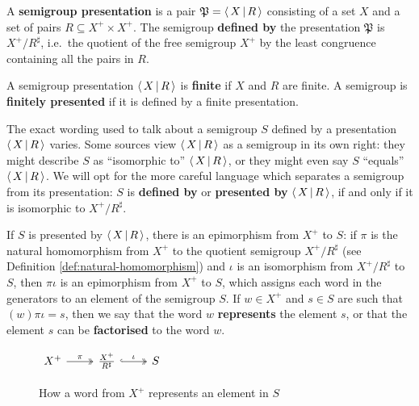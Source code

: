 \begin{definition}
  \label{def:presentation}
  A \textbf{semigroup presentation} is a pair $\mathfrak{P} = \left\langle\,X\,\middle|\,R\,\right\rangle$
  consisting of a set $X$ and a set of pairs $R \subseteq X^+ \times X^+$.  The
  semigroup \textbf{defined by} the presentation $\mathfrak{P}$ is
  $X^+ / R^\sharp$, i.e.~the quotient of the free semigroup $X^+$ by the least
  congruence containing all the pairs in $R$.
\end{definition}

\begin{definition}
  \label{def:finite-presentation}
  A semigroup presentation $\left\langle\,X\,\middle|\,R\,\right\rangle$ is \textbf{finite} if $X$ and $R$ are
  finite.  A semigroup is \textbf{finitely presented} if it is defined by a
  finite presentation.
\end{definition}

The exact wording used to talk about a semigroup $S$ defined by a presentation
$\left\langle\,X\,\middle|\,R\,\right\rangle$ varies.  Some sources view $\left\langle\,X\,\middle|\,R\,\right\rangle$ as a semigroup in its own
right: they might describe $S$ as ``isomorphic to'' $\left\langle\,X\,\middle|\,R\,\right\rangle$, or they might
even say $S$ ``equals'' $\left\langle\,X\,\middle|\,R\,\right\rangle$.  We will opt for the more careful language
which separates a semigroup from its presentation: $S$ is \textbf{defined by}  or
\textbf{presented by}  $\left\langle\,X\,\middle|\,R\,\right\rangle$, if and only if it is isomorphic to
$X^+ / R^\sharp$.

If $S$ is presented by $\left\langle\,X\,\middle|\,R\,\right\rangle$, there is an epimorphism from $X^+$ to $S$:
if $\pi$ is the natural homomorphism from $X^+$ to the quotient semigroup
$X^+ / R^\sharp$ (see Definition \ref{def:natural-homomorphism}) and $\iota$ is
an isomorphism from $X^+ / R^\sharp$ to $S$, then $\pi\iota$ is an epimorphism
from $X^+$ to $S$, which assigns each word in the generators to an element of
the semigroup $S$.  If $w \in X^+$ and $s \in S$ are such that
$(w)\pi\iota = s$, then we say that the word $w$ \textbf{represents}  the element
$s$, or that the element $s$ can be \textbf{factorised}  to the word $w$.

\begin{figure}[h]
  \centering
  $
  \begin{tikzcd}
    X^+ \ar[r, two heads, "\pi"] &
    \frac{X^+}{R^\sharp} \ar[r, two heads, hook, "\iota"] &
    S
  \end{tikzcd}
  $
  \caption[How a word represents a finitely presented semigroup element]{How a
    word from $X^+$ represents an element in $S$}
  \label{fig:word-represents-element}
\end{figure}

